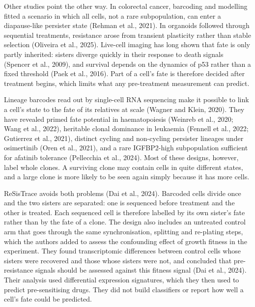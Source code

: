 \documentclass[11pt,a4paper]{article}
\begin{document}
Other studies point the other way. In colorectal cancer, barcoding and modelling fitted a scenario in which all cells, not a rare subpopulation, can enter a diapause-like persister state (Rehman et al., 2021). In organoids followed through sequential treatments, resistance arose from transient plasticity rather than stable selection (Oliveira et al., 2025). Live-cell imaging has long shown that fate is only partly inherited: sisters diverge quickly in their response to death signals (Spencer et al., 2009), and survival depends on the dynamics of p53 rather than a fixed threshold (Paek et al., 2016). Part of a cell's fate is therefore decided after treatment begins, which limits what any pre-treatment measurement can predict.

Lineage barcodes read out by single-cell RNA sequencing make it possible to link a cell's state to the fate of its relatives at scale (Wagner and Klein, 2020). They have revealed primed fate potential in haematopoiesis (Weinreb et al., 2020; Wang et al., 2022), heritable clonal dominance in leukaemia (Fennell et al., 2022; Gutierrez et al., 2021), distinct cycling and non-cycling persister lineages under osimertinib (Oren et al., 2021), and a rare IGFBP2-high subpopulation sufficient for afatinib tolerance (Pellecchia et al., 2024). Most of these designs, however, label whole clones. A surviving clone may contain cells in quite different states, and a large clone is more likely to be seen again simply because it has more cells.

ReSisTrace avoids both problems (Dai et al., 2024). Barcoded cells divide once and the two sisters are separated: one is sequenced before treatment and the other is treated. Each sequenced cell is therefore labelled by its own sister's fate rather than by the fate of a clone. The design also includes an untreated control arm that goes through the same synchronisation, splitting and re-plating steps, which the authors added to assess the confounding effect of growth fitness in the experiment. They found transcriptomic differences between control cells whose sisters were recovered and those whose sisters were not, and concluded that pre-resistance signals should be assessed against this fitness signal (Dai et al., 2024). Their analysis used differential expression signatures, which they then used to predict pre-sensitising drugs. They did not build classifiers or report how well a cell's fate could be predicted.
\end{document}
